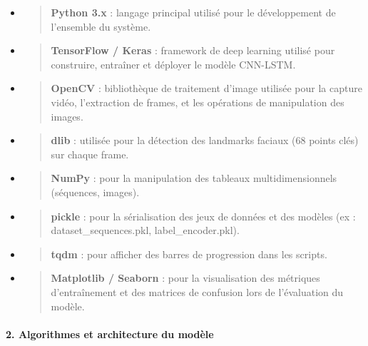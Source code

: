 \documentclass[
]{article}
\begin{document}
\begin{itemize}
\item
  \begin{quote}
  \textbf{Python 3.x} : langage principal utilisé pour le développement de l'ensemble du système.
  \end{quote}
\item
  \begin{quote}
  \textbf{TensorFlow / Keras} : framework de deep learning utilisé pour construire, entraîner et déployer le modèle CNN-LSTM.
  \end{quote}
\item
  \begin{quote}
  \textbf{OpenCV} : bibliothèque de traitement d'image utilisée pour la capture vidéo, l'extraction de frames, et les opérations de manipulation des images.
  \end{quote}
\item
  \begin{quote}
  \textbf{dlib} : utilisée pour la détection des landmarks faciaux (68 points clés) sur chaque frame.
  \end{quote}
\item
  \begin{quote}
  \textbf{NumPy} : pour la manipulation des tableaux multidimensionnels (séquences, images).
  \end{quote}
\item
  \begin{quote}
  \textbf{pickle} : pour la sérialisation des jeux de données et des modèles (ex : dataset\_sequences.pkl, label\_encoder.pkl).
  \end{quote}
\item
  \begin{quote}
  \textbf{tqdm} : pour afficher des barres de progression dans les scripts.
  \end{quote}
\item
  \begin{quote}
  \textbf{Matplotlib / Seaborn} : pour la visualisation des métriques d'entraînement et des matrices de confusion lors de l'évaluation du modèle.
  \end{quote}
\end{itemize}

\hypertarget{algorithmes-et-architecture-du-moduxe8le}{%
\paragraph{\texorpdfstring{\textbf{2. Algorithmes et architecture du modèle}}{2. Algorithmes et architecture du modèle}}\label{algorithmes-et-architecture-du-moduxe8le}}
\end{document}
